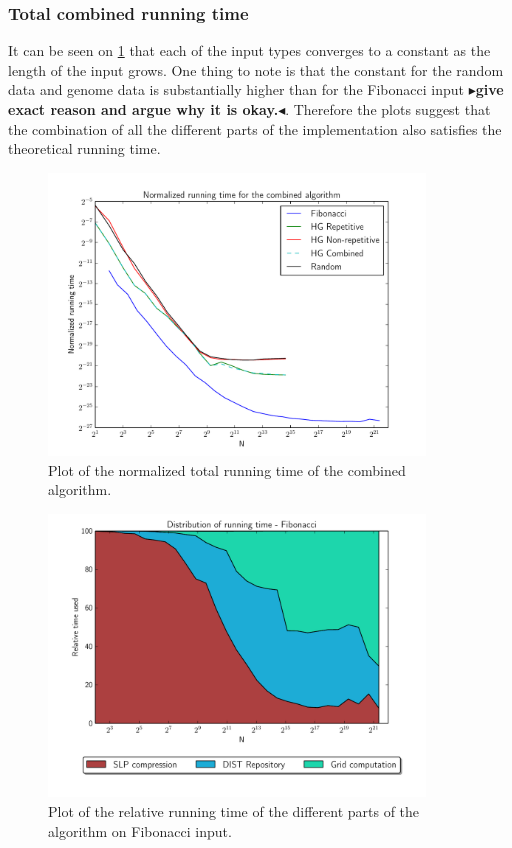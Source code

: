 \documentclass[twoside,11pt,openright]{report}
\newcommand{\todo}[1]{{\color[rgb]{.5,0,0}\textbf{$\blacktriangleright$#1$\blacktriangleleft$}}}
\begin{document}
\subsubsection{Total combined running time}
It can be seen on \cref{fig:benchmark:total-time-combined} that each of the input types converges to a constant as the length of the input grows. One thing to note is that the constant for the random data and genome data is substantially higher than for the Fibonacci input \todo{give exact reason and argue why it is okay.}. Therefore the plots suggest that the combination of all the different parts of the implementation also satisfies the theoretical running time.
\begin{figure}[h!]
  \centering
  \includegraphics[width=10cm]{combined/total_runningtime}
  \caption{Plot of the normalized total running time of the combined algorithm.}
  \label{fig:benchmark:total-time-combined}
\end{figure}

\begin{figure}[h!]
  \centering
  \includegraphics[width=10cm]{combined/fib_area_plot}
  \caption{Plot of the relative running time of the different parts of the algorithm on Fibonacci input.}
  \label{fig:benchmark:relative-runningtime-fib}
\end{figure}
\end{document}
